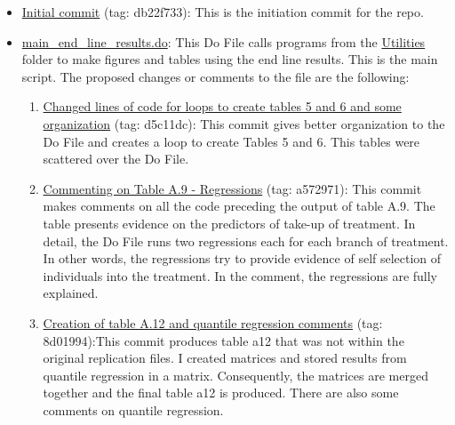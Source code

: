 \documentclass{article}
\begin{document}
    \begin{itemize}
    
        \item \href{https://github.com/jorgeluis8ar/Revised-reproduction-package-for-Abebe-et-al-2021/commit/db2f73317a593a30509195413c5c7fff3020f6f0}{Initial commit} (tag: db22f733): This is the initiation commit for the repo.
        
        \item \href{https://github.com/jorgeluis8ar/Revised-reproduction-package-for-Abebe-et-al-2021/blob/main/Proposed\%20Replication\%20File/do/main_endline_results.do}{main\_end\_line\_results.do}: This Do File calls programs from the \href{https://github.com/jorgeluis8ar/Revised-reproduction-package-for-Abebe-et-al-2021/tree/main/Proposed\%20Replication\%20File/utilities}{Utilities} folder to make figures and tables using the end line results. This is the main script. The proposed changes or comments to the file are the following:
        
            \begin{enumerate}[label=\roman*]
            
                \item \href{https://github.com/jorgeluis8ar/Revised-reproduction-package-for-Abebe-et-al-2021/commit/d5c11dcb7b29ba319e42c9d09c46756ca05923f4}{Changed lines of code for loops to create tables 5 and 6 and some organization} (tag: d5c11dc): This commit gives better organization to the Do File and creates a loop to create Tables 5 and 6. This tables were scattered over the Do File.
                
                \item \href{https://github.com/jorgeluis8ar/Revised-reproduction-package-for-Abebe-et-al-2021/commit/a572971f09dbdd7fecb0b114e18fbccaf0c7d5d7}{Commenting on Table A.9 - Regressions} (tag: a572971): This commit makes comments on all the code preceding the output of table A.9. The table presents evidence on the predictors of take-up of treatment. In detail, the Do File runs two regressions each for each branch of treatment. In other words, the regressions try to provide evidence of self selection of individuals into the treatment. In the comment, the regressions are fully explained.
                
                \item \href{https://github.com/jorgeluis8ar/Revised-reproduction-package-for-Abebe-et-al-2021/commit/8d01994ec7aae7555512a7db8c3aa07e08492e41}{Creation of table A.12 and quantile regression comments} (tag: 8d01994):This commit produces table a12 that was not within the original replication files. I created matrices and stored results from quantile regression in a matrix. Consequently, the matrices are merged together and the final table a12 is produced. There are also some comments on quantile regression.
                

\end{enumerate}
\end{itemize}
\end{document}
